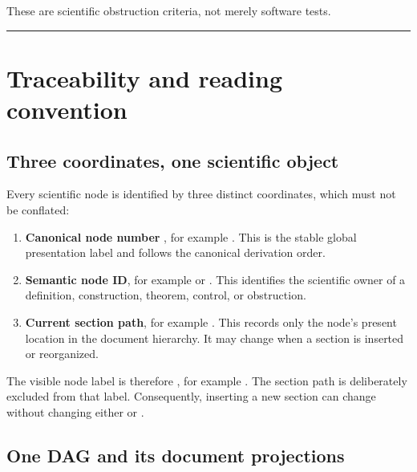These are scientific obstruction criteria, not merely software tests.

\begin{center}\rule{0.5\linewidth}{0.5pt}\end{center}

\section{Traceability and reading
convention}\label{traceability-and-reading-convention}

\subsection{Three coordinates, one scientific
object}\label{three-coordinates-one-scientific-object}

Every scientific node is identified by three distinct coordinates, which
must not be conflated:

\begin{enumerate}
\def\labelenumi{\arabic{enumi}.}
\tightlist
\item
  \textbf{Canonical node number} \texttt{\protect{}}, for example \texttt{\protect{}}.
  This is the stable global presentation label and follows the canonical
  derivation order.
\item
  \textbf{Semantic node ID}, for example \texttt{\protect{}} or \texttt{\protect{}}.
  This identifies the scientific owner of a definition, construction,
  theorem, control, or obstruction.
\item
  \textbf{Current section path}, for example \texttt{\protect{}}. This
  records only the node's present location in the document hierarchy. It
  may change when a section is inserted or reorganized.
\end{enumerate}

The visible node label is therefore \texttt{\protect{}}, for example
\texttt{\protect{}}. The section path is deliberately excluded from
that label. Consequently, inserting a new section can change
\texttt{\protect{}} without changing either \texttt{\protect{}} or \texttt{\protect{}}.

\subsection{One DAG and its document
projections}\label{one-dag-and-its-document-projections}

